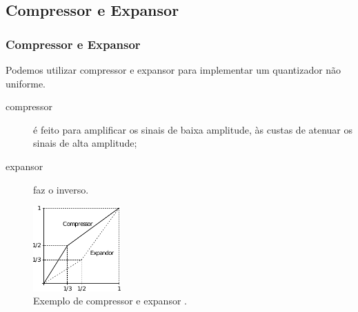 \subsection{Compressor e Expansor}
\begin{frame}%
  \frametitle{Compressor e Expansor}
  Podemos utilizar compressor e expansor para implementar um quantizador não uniforme.

  \begin{description}
  \item[compressor] é feito para amplificar os sinais de baixa amplitude, às custas de atenuar os sinais de alta amplitude;
  \item[expansor] faz o inverso.
  \end{description}

  \begin{figure}[h!]
  \centering
  \includegraphics[width=0.3\textwidth]{images/compressor.pdf}
  \caption{Exemplo de compressor e expansor \citep{tokunbo}.}
  \label{fig:compressor}
  \end{figure}
\end{frame}


